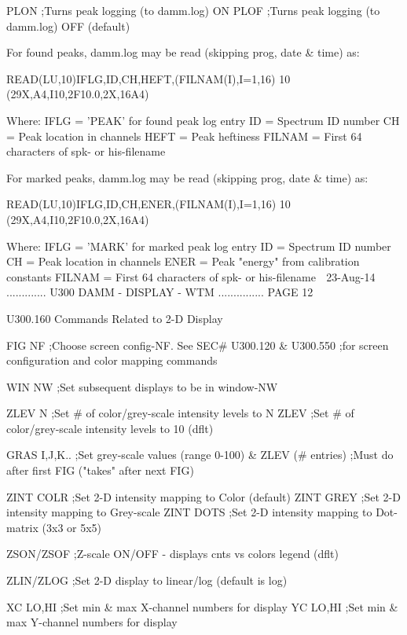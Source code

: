   PLON           ;Turns peak logging (to damm.log) ON
   PLOF           ;Turns peak logging (to damm.log) OFF (default)
 
   For found peaks, damm.log may be read (skipping prog, date & time) as:
 
          READ(LU,10)IFLG,ID,CH,HEFT,(FILNAM(I),I=1,16)
       10 (29X,A4,I10,2F10.0,2X,16A4)
 
   Where: IFLG   = 'PEAK' for found peak log entry
          ID     = Spectrum ID number
          CH     = Peak location in channels
          HEFT   = Peak heftiness
          FILNAM = First 64 characters of spk- or his-filename
 
   For marked peaks, damm.log may be read (skipping prog, date & time) as:
 
          READ(LU,10)IFLG,ID,CH,ENER,(FILNAM(I),I=1,16)
       10 (29X,A4,I10,2F10.0,2X,16A4)
 
   Where: IFLG   = 'MARK' for marked peak log entry
          ID     = Spectrum ID number
          CH     = Peak location in channels
          ENER   = Peak "energy" from calibration constants
          FILNAM = First 64 characters of spk- or his-filename
    
   23-Aug-14 ............. U300  DAMM - DISPLAY - WTM ............... PAGE  12
 
   U300.160  Commands Related to 2-D Display
 
   FIG   NF       ;Choose screen config-NF. See SEC# U300.120 & U300.550
                  ;for screen configuration and color mapping commands
 
   WIN   NW       ;Set subsequent displays to be in window-NW
 
   ZLEV  N        ;Set # of color/grey-scale intensity levels to N
   ZLEV           ;Set # of color/grey-scale intensity levels to 10 (dflt)
 
   GRAS  I,J,K..  ;Set grey-scale values (range 0-100) & ZLEV (# entries)
                  ;Must do after first FIG  ("takes" after next FIG)
 
   ZINT  COLR     ;Set 2-D intensity mapping to Color (default)
   ZINT  GREY     ;Set 2-D intensity mapping to Grey-scale
   ZINT  DOTS     ;Set 2-D intensity mapping to Dot-matrix (3x3 or 5x5)
 
   ZSON/ZSOF      ;Z-scale ON/OFF - displays cnts vs colors legend (dflt)
 
   ZLIN/ZLOG      ;Set 2-D display to linear/log (default is log)
 
   XC    LO,HI    ;Set min & max X-channel numbers for display
   YC    LO,HI    ;Set min & max Y-channel numbers for display
 
